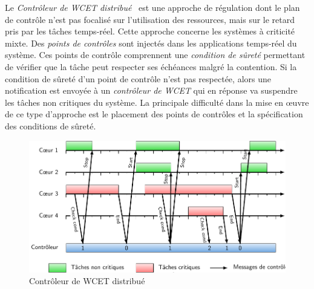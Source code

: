 Le \emph{Contrôleur de WCET distribué}~\cite{kritikakou2014run,kritikakou2014distributed} est une approche de régulation dont le plan de contrôle n'est pas focalisé sur l'utilisation des ressources, mais sur le retard pris par les tâches temps-réel.
Cette approche concerne les systèmes à criticité mixte.
Des \emph{points de contrôles} sont injectés dans les applications temps-réel du système.
Ces points de contrôle comprennent une \emph{condition de sûreté} permettant de vérifier que la tâche peut respecter ses échéances malgré la contention.
Si la condition de sûreté d'un point de contrôle n'est pas respectée, alors une notification est envoyée à un \emph{contrôleur de WCET} qui en réponse va suspendre les tâches non critiques du système.
La principale difficulté dans la mise en œuvre de ce type d'approche est le placement des points de contrôles et la spécification des conditions de sûreté.


\begin{figure}
	\centering
	\includegraphics[width=\linewidth]{graphics/figures/kri.pdf}
	\caption{\label{fig:kritikakou}Contrôleur de WCET distribué}
\end{figure}

